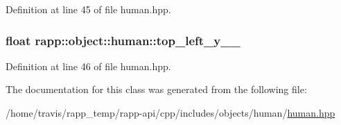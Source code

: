 Definition at line 45 of file human.\-hpp.

\hypertarget{classrapp_1_1object_1_1human_af9138598f983c97795297a164f6a8977}{
\subsubsection[{top\-\_\-left\-\_\-y\-\_\-\-\_\-}]{\setlength{\rightskip}{0pt plus 5cm}float rapp\-::object\-::human\-::top\-\_\-left\-\_\-y\-\_\-\-\_\-\hspace{0.3cm}{\ttfamily [private]}}}\label{classrapp_1_1object_1_1human_af9138598f983c97795297a164f6a8977}


Definition at line 46 of file human.\-hpp.



The documentation for this class was generated from the following file\-:\begin{DoxyCompactItemize}
\item 
/home/travis/rapp\-\_\-temp/rapp-\/api/cpp/includes/objects/human/\hyperlink{human_8hpp}{human.\-hpp}\end{DoxyCompactItemize}
